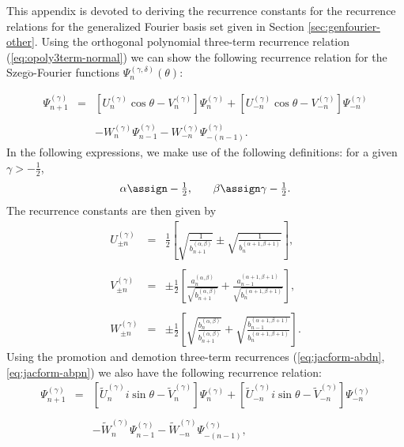\label{app:recurrence}This appendix is devoted to deriving the recurrence
constants for the recurrence relations for the generalized Fourier basis set
given in Section \ref{sec:genfourier-other}. Using the orthogonal polynomial
three-term recurrence relation (\ref{eq:opoly3term-normal}) we can show the
following recurrence relation for the Szeg$\ddot{\text{o}}$-Fourier functions
$\Psi_n^{(\gamma, \delta)} (\theta)$:


\begin{equation}
  \label{eq:Psi-cosrecurrence} \begin{array}{lll}
    \Psi_{n + 1}^{(\gamma)} & = & \left[ U_n^{(\gamma)} \cos \theta -
    V_n^{(\gamma)} \right] \Psi_n^{(\gamma)} + \left[ U_{- n}^{(\gamma)} \cos
    \theta - V_{- n}^{(\gamma)} \right] \Psi_{- n}^{(\gamma)}\\
    &  & \\
    &  & - W_n^{(\gamma)} \Psi_{n - 1}^{(\gamma)} - W_{- n}^{(\gamma)}
    \Psi_{- (n - 1)}^{(\gamma)} .
  \end{array}
\end{equation}
In the following expressions, we make use of the following definitions: for a
given $\gamma > - \frac{1}{2}$,
\[ \begin{array}{lll}
     \alpha \assign - \frac{1}{2}, &  & \beta \assign \gamma - \frac{1}{2} .
   \end{array} \]
The recurrence constants are then given by
\[ \begin{array}{lll}
     U_{\pm n}^{(\gamma)} & = & \frac{1}{2} \left[ \sqrt{\frac{1}{b_{n +
     1}^{(\alpha, \beta)}}} \pm \sqrt{\frac{1}{b_n^{(\alpha + 1, \beta + 1)}}}
     \right],\\
     &  & \\
     V_{\pm n}^{(\gamma)} & = & \pm \frac{1}{2} \left[ \frac{a_n^{(\alpha,
     \beta)}}{\sqrt{b_{n + 1}^{(\alpha, \beta)}}} + \frac{a_{n - 1}^{(\alpha +
     1, \beta + 1)}}{\sqrt{b_n^{(\alpha + 1, \beta + 1)}}} \right],\\
     &  & \\
     W_{\pm n}^{(\gamma)} & = & \pm \frac{1}{2} \left[
     \sqrt{\frac{b_n^{(\alpha, \beta)}}{b_{n + 1}^{(\alpha, \beta)}}} +
     \sqrt{\frac{b_{n - 1}^{(\alpha + 1, \beta + 1)}}{b_n^{(\alpha + 1, \beta
     + 1)}}} \right] .
   \end{array} \]
Using the promotion and demotion three-term recurrences
(\ref{eq:jacform-abdn}, \ref{eq:jacform-abpn}) we also have the following
recurrence relation:
\begin{equation}
  \label{eq:Psi-sinrecurrence} \begin{array}{lll}
    \Psi_{n + 1}^{(\gamma)} & = & \left[ \tilde{U}_n^{(\gamma)} i \sin \theta
    - \tilde{V}_n^{(\gamma)} \right] \Psi_n^{(\gamma)} + \left[ \tilde{U}_{-
    n}^{(\gamma)} i \sin \theta - \tilde{V}_{- n}^{(\gamma)} \right] \Psi_{-
    n}^{(\gamma)}\\
    &  & \\
    &  & - \tilde{W}_n^{(\gamma)} \Psi_{n - 1}^{(\gamma)} - \tilde{W}_{-
    n}^{(\gamma)} \Psi_{- (n - 1)}^{(\gamma)},
  \end{array}
\end{equation}
